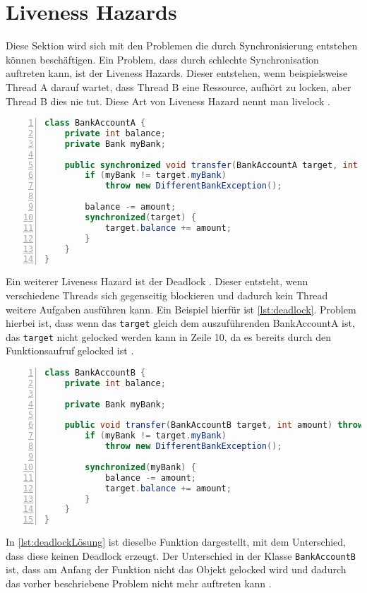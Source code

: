 \section{Liveness Hazards}

Diese Sektion wird sich mit den Problemen die durch Synchronisierung entstehen können beschäftigen. Ein Problem, dass durch schlechte Synchronisation auftreten kann, ist der Liveness Hazards. Dieser entstehen, wenn beispielsweise Thread A darauf wartet, dass Thread B eine Ressource, aufhört zu locken, aber Thread B dies nie tut. Diese Art von Liveness Hazard nennt man livelock \cite[vgl.][5-6]{brian}.\\

\begin{lstlisting}[language=Java,frame=tb,caption={Deadlock \cite{fekete_teaching_nodate}}, label={lst:deadlock}, numbers=left, stepnumber=1, captionpos=b, tabsize=4]
class BankAccountA {
    private int balance; 
    private Bank myBank; 

    public synchronized void transfer(BankAccountA target, int amount) throws DifferentBankException {
        if (myBank != target.myBank) 
            throw new DifferentBankException(); 
        
        balance -= amount; 
        synchronized(target) { 
            target.balance += amount; 
        } 
    }
}
\end{lstlisting}
\noindent
Ein weiterer Liveness Hazard ist der Deadlock \cite[vgl.][6]{brian}. Dieser entsteht, wenn verschiedene Threads sich gegenseitig blockieren und dadurch kein Thread weitere Aufgaben ausführen kann. Ein Beispiel hierfür ist \ref{lst:deadlock}. Problem hierbei ist, dass wenn das \texttt{target} gleich dem auszuführenden BankAccountA ist, das \texttt{target} nicht gelocked werden kann in Zeile 10, da es bereits durch den Funktionsaufruf gelocked ist \cite[vgl.][122]{fekete_teaching_nodate}. 
\\
\begin{lstlisting}[language=Java,frame=tb,caption={Deadlock Lösung \cite{fekete_teaching_nodate}}, label={lst:deadlockLösung}, numbers=left, stepnumber=1, captionpos=b, tabsize=4]
class BankAccountB { 
    private int balance; 
    
    private Bank myBank; 

    public void transfer(BankAccountB target, int amount) throws DifferentBankException { 
        if (myBank != target.myBank)
            throw new DifferentBankException(); 
        
        synchronized(myBank) { 
            balance -= amount; 
            target.balance += amount; 
        } 
    }
}
\end{lstlisting}
\noindent
In \ref{lst:deadlockLösung} ist dieselbe Funktion dargestellt, mit dem Unterschied, dass diese keinen Deadlock erzeugt. Der Unterschied in der Klasse \texttt{BankAccountB} ist, dass am Anfang der Funktion nicht das Objekt gelocked wird und dadurch das vorher beschriebene Problem nicht mehr auftreten kann \cite[vgl.][122]{fekete_teaching_nodate}.